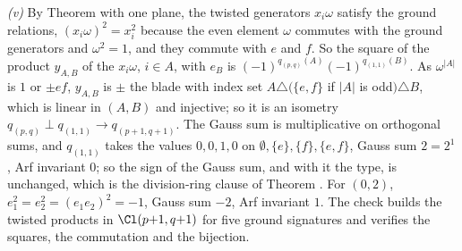\emph{(v)} By Theorem  with one plane, the twisted generators $x_{i}\omega$ satisfy the ground relations, $(x_{i}\omega)^{2} = x_{i}^{2}$ because the even element $\omega$ commutes with the ground generators and $\omega^{2} = 1$, and they commute with $e$ and $f$. So the square of the product $y_{A,B}$ of the $x_{i}\omega$, $i \in A$, with $e_{B}$ is $(-1)^{q_{(p,q)}(A)}(-1)^{q_{(1,1)}(B)}$. As $\omega^{|A|}$ is $1$ or $\pm ef$, $y_{A,B}$ is $\pm$ the blade with index set $A \triangle (\{e, f\}$ if $|A|$ is odd$) \triangle B$, which is linear in $(A, B)$ and injective; so it is an isometry $q_{(p,q)} \perp q_{(1,1)} \to q_{(p+1,q+1)}$. The Gauss sum is multiplicative on orthogonal sums, and $q_{(1,1)}$ takes the values $0, 0, 1, 0$ on $\emptyset, \{e\}, \{f\}, \{e,f\}$, Gauss sum $2 = 2^{1}$, Arf invariant $0$; so the sign of the Gauss sum, and with it the type, is unchanged, which is the division-ring clause of Theorem . For $(0,2)$, $e_{1}^{2} = e_{2}^{2} = (e_{1}e_{2})^{2} = -1$, Gauss sum $-2$, Arf invariant $1$. The check builds the twisted products in $\Cl(p{+}1, q{+}1)$ for five ground signatures and verifies the squares, the commutation and the bijection.
